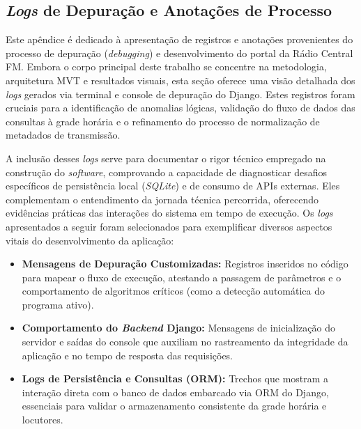 \documentclass[12pt, openright, oneside, a4paper, brazil]{ads-unipac-abntex2}
\begin{document}
\begin{apendicesenv}

\chapter{\textit{Logs} de Depuração e Anotações de Processo}
Este apêndice é dedicado à apresentação de registros e anotações provenientes do processo de depuração (\textit{debugging}) e desenvolvimento do portal da Rádio Central FM. Embora o corpo principal deste trabalho se concentre na metodologia, arquitetura MVT e resultados visuais, esta seção oferece uma visão detalhada dos \textit{logs} gerados via terminal e console de depuração do Django. Estes registros foram cruciais para a identificação de anomalias lógicas, validação do fluxo de dados das consultas à grade horária e o refinamento do processo de normalização de metadados de transmissão.

A inclusão desses \textit{logs} serve para documentar o rigor técnico empregado na construção do \textit{software}, comprovando a capacidade de diagnosticar desafios específicos de persistência local (\textit{SQLite}) e de consumo de APIs externas. Eles complementam o entendimento da jornada técnica percorrida, oferecendo evidências práticas das interações do sistema em tempo de execução. Os \textit{logs} apresentados a seguir foram selecionados para exemplificar diversos aspectos vitais do desenvolvimento da aplicação:

\begin{itemize}
    \item \textbf{Mensagens de Depuração Customizadas:} Registros inseridos no código para mapear o fluxo de execução, atestando a passagem de parâmetros e o comportamento de algoritmos críticos (como a detecção automática do programa ativo).
    \item \textbf{Comportamento do \textit{Backend} Django:} Mensagens de inicialização do servidor e saídas do console que auxiliam no rastreamento da integridade da aplicação e no tempo de resposta das requisições.
    \item \textbf{Logs de Persistência e Consultas (ORM):} Trechos que mostram a interação direta com o banco de dados embarcado via ORM do Django, essenciais para validar o armazenamento consistente da grade horária e locutores.
\end{itemize}

\vspace{0.5cm}


\end{apendicesenv}
\end{document}

